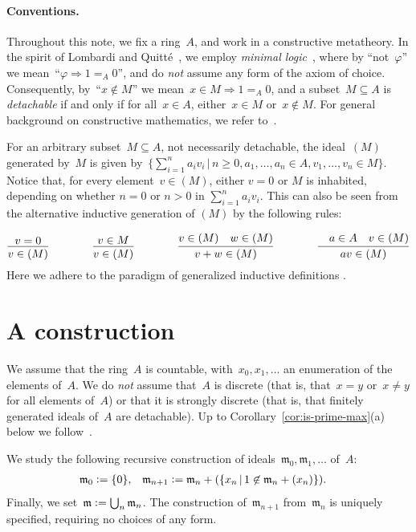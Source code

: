\documentclass[envcountsect,envcountsame,runningheads]{llncs}
\newcommand{\mmm}{\mathfrak{m}}
\newcommand{\defeq}{\vcentcolon=}
\renewcommand{\_}{\mathpunct{.}\,}
\begin{document}
\paragraph{Conventions.} Throughout this note, we fix a ring~$A$, and work in a constructive metatheory.
In the spirit of Lombardi and Quitté~\cite{lombardi-quitte:constructive-algebra}, we employ \emph{minimal
logic}~\cite{johansson:minimal}, where by ``not~$\varphi$'' we mean~``$\varphi \Rightarrow 1 =_A 0$'', and do \emph{not} assume any form of the axiom of choice. Consequently,
by~``$x \not\in M$'' we mean~$x \in M \Rightarrow 1 =_A 0$, and a subset~$M
\subseteq A$ is \emph{detachable} if and only if for all~$x \in A$, either~$x \in M$
or~$x \not\in M$. For general background on constructive mathematics, we refer
to~\cite{bauer:five-stages,bauer:int-mathematics,sep:constructive-mathematics}.

For an arbitrary subset~$M \subseteq A$, not necessarily
detachable, the ideal~$(M)$ generated by~$M$ is given by~$\bigl\{ \sum_{i=1}^n
a_i v_i \,\Big|\, n \geq 0, a_1,\ldots,a_n \in A, v_1,\ldots,v_n \in M \bigr\}$.
Notice that, for every element~$v \in (M)$, either $v = 0$ or $M$ is inhabited, depending on whether
$n=0$ or $n>0$ in $\sum_{i=1}^n a_i v_i$. This can also be seen from the alternative inductive
generation of $(M)$ by the following rules:\par
{\vspace*{-0.8em}\small\[
\infer{v \in (M)}{v=0}
\qquad\qquad
\infer{v \in (M)}{v \in M}
\qquad\qquad
\infer{v+w \in (M)}{v \in (M)\quad w \in (M)}
\qquad\qquad
\infer{av \in (M)}{\quad a\in A \quad v \in (M)}
\]}%
\noindent Here we adhere to the paradigm of generalized inductive definitions
\cite{aczel-rathjen:notes,aczel-rathjen:cstdraft,rathjen:genind}.


\section{A construction}
\label{sect:constr}

We assume that the ring~$A$ is countable, with~$x_0, x_1, \ldots$ an
enumeration of the elements of~$A$. We do \emph{not} assume that~$A$ is
discrete (that is, that~$x = y$ or~$x \neq y$ for all elements of~$A$) or that
it is strongly discrete (that is, that finitely generated
ideals of~$A$ are detachable). Up to Corollary~\ref{cor:is-prime-max}(a) below
we follow~\cite{berardi-valentini:krivine}.

We study the following recursive construction of ideals~$\mmm_0, \mmm_1,
\ldots$ of~$A$:
\begin{align*}
  \mmm_0 &\defeq \{0\}, &
  \mmm_{n+1} &\defeq \mmm_n + (\{ x_n \,|\, 1 \not\in \mmm_n + (x_n) \}).
\end{align*}
Finally, we set~$\mmm \defeq \bigcup_n \mmm_n$. The construction
of~$\mmm_{n+1}$ from~$\mmm_n$ is uniquely specified, requiring no choices of
any form.
\end{document}
